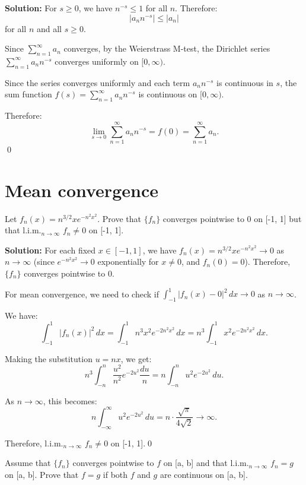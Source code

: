\noindent\textbf{Solution:} For \( s \geq 0 \), we have \( n^{-s} \leq 1 \) for all \( n \). Therefore:
\[|a_n n^{-s}| \leq |a_n|\]
for all \( n \) and all \( s \geq 0 \).

Since \( \sum_{n=1}^{\infty} a_n \) converges, by the Weierstrass M-test, the Dirichlet series \( \sum_{n=1}^{\infty} a_n n^{-s} \) converges uniformly on \( [0, \infty) \).

Since the series converges uniformly and each term \( a_n n^{-s} \) is continuous in \( s \), the sum function \( f(s) = \sum_{n=1}^{\infty} a_n n^{-s} \) is continuous on \( [0, \infty) \).

Therefore:
\[\lim_{s \to 0} \sum_{n=1}^{\infty} a_n n^{-s} = f(0) = \sum_{n=1}^{\infty} a_n.\]\qed
\section{Mean convergence}



\begin{problembox}
Let \( f_n(x) = n^{3/2}xe^{-n^2x^2} \). Prove that \( \{f_n\} \) converges pointwise to 0 on [-1, 1] but that l.i.m.\(_{n\to\infty}\) \( f_n \neq 0 \) on [-1, 1].
\end{problembox}

\noindent\textbf{Solution:} For each fixed \( x \in [-1, 1] \), we have \( f_n(x) = n^{3/2}xe^{-n^2x^2} \to 0 \) as \( n \to \infty \) (since \( e^{-n^2x^2} \to 0 \) exponentially for \( x \neq 0 \), and \( f_n(0) = 0 \)). Therefore, \( \{f_n\} \) converges pointwise to 0.

For mean convergence, we need to check if \( \int_{-1}^1 |f_n(x) - 0|^2 \, dx \to 0 \) as \( n \to \infty \).

We have:
\[\int_{-1}^1 |f_n(x)|^2 \, dx = \int_{-1}^1 n^3 x^2 e^{-2n^2x^2} \, dx = n^3 \int_{-1}^1 x^2 e^{-2n^2x^2} \, dx.\]

Making the substitution \( u = nx \), we get:
\[n^3 \int_{-n}^n \frac{u^2}{n^2} e^{-2u^2} \frac{du}{n} = n \int_{-n}^n u^2 e^{-2u^2} \, du.\]

As \( n \to \infty \), this becomes:
\[n \int_{-\infty}^{\infty} u^2 e^{-2u^2} \, du = n \cdot \frac{\sqrt{\pi}}{4\sqrt{2}} \to \infty.\]

Therefore, l.i.m.\(_{n\to\infty}\) \( f_n \neq 0 \) on [-1, 1].\qed


\begin{problembox}
Assume that \( \{f_n\} \) converges pointwise to \( f \) on [a, b] and that l.i.m.\(_{n\to\infty}\) \( f_n = g \) on [a, b]. Prove that \( f = g \) if both \( f \) and \( g \) are continuous on [a, b].
\end{problembox}

